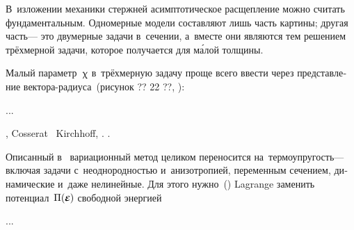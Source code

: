 \begin{otherlanguage}{russian}

В~изложении механики стержней асимптотическое расщепление можно считать фундаментальным.
Одномерные модели составляют лишь часть картины; другая часть\:--- это двумерные задачи в~сечении, а~вместе они являются тем решением трёхмерной задачи, которое получается для м\'{а}лой толщины.

Малый параметр~$\upchi$ в~трёхмерную задачу проще всего ввести через представление вектора\hbox{-}радиуса~(рисунок ?? 22 ??, ):

...



\end{otherlanguage}



,    Cosserat ~Kirchhoff,  .
    .

\begin{otherlanguage}{russian}

Описанный в~ вариационный метод целиком переносится на~термоупругость\:--- включая задачи с~неоднородностью и~анизотропией, переменным сечением, динамические и~даже нелинейные.
Для этого нужно~()
 Lagrange 
заменить потенциал~${\potential(\hspace{-0.1ex}\infinitesimaldeformation\hspace{-0.1ex})\hspace{-0.1ex}}$
свободной энергией

...




\end{otherlanguage}


